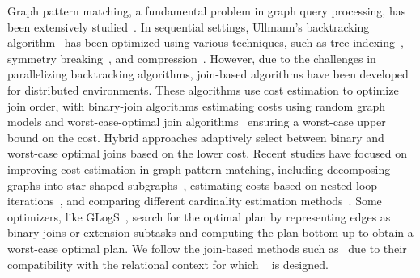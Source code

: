  Graph pattern matching, a fundamental problem in graph query processing, has been extensively studied~\cite{angles2017foundations}. In sequential settings, Ullmann's backtracking algorithm~\cite{ullmann1976algorithm} has been optimized using various techniques, such as tree indexing~\cite{shang2008quicksi}, symmetry breaking~\cite{han13turbo}, and compression~\cite{bi2016efficient}. However, due to the challenges in parallelizing backtracking algorithms, join-based algorithms have been developed for distributed environments. These algorithms use cost estimation to optimize join order, with binary-join algorithms\cite{lai2015scalable, lai2019distributed} estimating costs using random graph models and worst-case-optimal join algorithms~\cite{ammar2018distributed} ensuring a worst-case upper bound on the cost. Hybrid approaches\cite{mhedhbi2019optimizing, huge} adaptively select between binary and worst-case optimal joins based on the lower cost. Recent studies have focused on improving cost estimation in graph pattern matching, including decomposing graphs into star-shaped subgraphs~\cite{cset}, estimating costs based on nested loop iterations~\cite{AutoMine}, and comparing different cardinality estimation methods~\cite{gcare}. Some optimizers, like GLogS~\cite{GLogS}, search for the optimal plan by representing edges as binary joins or extension subtasks and computing the plan bottom-up to obtain a worst-case optimal plan.
We follow the join-based methods such as~\cite{huge,GLogS} due to their compatibility with the relational context for which \name~ is designed. %


